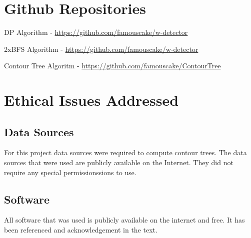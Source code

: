 \begin{appendices}
\chapter{Github Repositories}
\label{chapter-github}


DP Algorithm - \url{https://github.com/famouscake/w-detector}

2xBFS Algorithm - \url{https://github.com/famouscake/w-detector}

Contour Tree Algoritm - \url{https://github.com/famouscake/ContourTree}


\chapter{Ethical Issues Addressed}
\label{chapter-ethical}

\section{Data Sources}

For this project data sources were required to compute contour trees. The data sources that were used are publicly available on the Internet. They did not require any special permissionssions to use.

\section{Software}
All software that was used is publicly available on the internet and free. It has been referenced and acknowledgement in the text.


\end{appendices}

